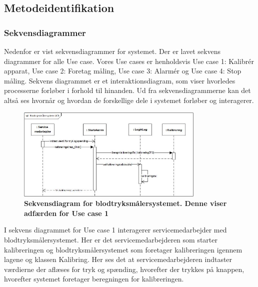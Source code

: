 \subsection{Metodeidentifikation}
\subsubsection{Sekvensdiagrammer}
Nedenfor er vist sekvensdiagrammer for systemet. Der er lavet sekvens diagrammer for alle Use case. Vores Use cases er henholdsvis Use case 1: Kalibrér apparat, Use case 2: Foretag måling, Use case 3: Alarmér og Use case 4: Stop måling. Sekvens diagrammet er et interaktionsdiagram, som viser hvorledes processerne forløber i forhold til hinanden. Ud fra sekvensdiagrammerne kan det altså ses hvornår og hvordan de forskellige dele i systemet forløber og interagerer. \\
\begin{figure}[H]
\includegraphics[width =0.8\textwidth , center]{billeder/sdUC1}
\caption{\textbf{Sekvensdiagram for blodtryksmålersystemet. Denne viser adfærden for Use case 1 }}
\end{figure}
I sekvens diagrammet for Use case 1 interagerer servicemedarbejder med blodtryksmålersystemet. Her er det servicemedarbejderen som starter kalibreringen og blodtryksmålersystemet som foretager kalibreringen igennem lagene og klassen Kalibring. Her ses det at servicemedarbejderen indtaster værdierne der aflæses for tryk og spænding, hvorefter der trykkes på knappen, hvorefter systemet foretager beregningen for kalibreringen. 
